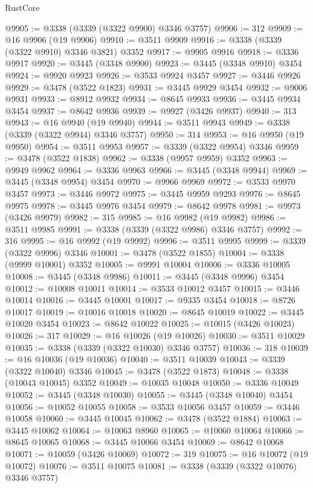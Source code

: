 \begin{lexlean}{RustCore}
\begin{coremodule}
@9905 := @3338 (@3339 (@3322 @9900) @3346 @3757)
@9906 := 312
@9909 := @16 @9906 (@19 @9906)
@9910 := @3511 @9909
@9916 := @3338 (@3339 (@3322 @9910) @3346 @3821) @3352
@9917 := @9905 @9916
@9918 := @3336 @9917
@9920 := @3445 (@3348 @9900)
@9923 := @3445 (@3348 @9910) @3454
@9924 := @9920 @9923
@9926 := @3533 @9924 @3457
@9927 := @3446 @9926
@9929 := @3478 (@3522 @1823)
@9931 := @3445 @9929 @3454
@9932 := @9006 @9931
@9933 := @8912 @9932
@9934 := @8645 @9933
@9936 := @3445 @9934 @3454
@9937 := @8642 @9936
@9939 := @9927 (@3426 @9937)
@9940 := 313
@9943 := @16 @9940 (@19 @9940)
@9944 := @3511 @9943
@9949 := @3338 (@3339 (@3322 @9944) @3346 @3757)
@9950 := 314
@9953 := @16 @9950 (@19 @9950)
@9954 := @3511 @9953
@9957 := @3339 (@3322 @9954) @3346
@9959 := @3478 (@3522 @1838)
@9962 := @3338 (@9957 @9959) @3352
@9963 := @9949 @9962
@9964 := @3336 @9963
@9966 := @3445 (@3348 @9944)
@9969 := @3445 (@3348 @9954) @3454
@9970 := @9966 @9969
@9972 := @3533 @9970 @3457
@9973 := @3446 @9972
@9975 := @3445 @9959 @9293
@9976 := @8645 @9975
@9978 := @3445 @9976 @3454
@9979 := @8642 @9978
@9981 := @9973 (@3426 @9979)
@9982 := 315
@9985 := @16 @9982 (@19 @9982)
@9986 := @3511 @9985
@9991 := @3338 (@3339 (@3322 @9986) @3346 @3757)
@9992 := 316
@9995 := @16 @9992 (@19 @9992)
@9996 := @3511 @9995
@9999 := @3339 (@3322 @9996) @3346
@10001 := @3478 (@3522 @1855)
@10004 := @3338 (@9999 @10001) @3352
@10005 := @9991 @10004
@10006 := @3336 @10005
@10008 := @3445 (@3348 @9986)
@10011 := @3445 (@3348 @9996) @3454
@10012 := @10008 @10011
@10014 := @3533 @10012 @3457
@10015 := @3446 @10014
@10016 := @3445 @10001
@10017 := @9335 @3454
@10018 := @8726 @10017
@10019 := @10016 @10018
@10020 := @8645 @10019
@10022 := @3445 @10020 @3454
@10023 := @8642 @10022
@10025 := @10015 (@3426 @10023)
@10026 := 317
@10029 := @16 @10026 (@19 @10026)
@10030 := @3511 @10029
@10035 := @3338 (@3339 (@3322 @10030) @3346 @3757)
@10036 := 318
@10039 := @16 @10036 (@19 @10036)
@10040 := @3511 @10039
@10043 := @3339 (@3322 @10040) @3346
@10045 := @3478 (@3522 @1873)
@10048 := @3338 (@10043 @10045) @3352
@10049 := @10035 @10048
@10050 := @3336 @10049
@10052 := @3445 (@3348 @10030)
@10055 := @3445 (@3348 @10040) @3454
@10056 := @10052 @10055
@10058 := @3533 @10056 @3457
@10059 := @3446 @10058
@10060 := @3445 @10045
@10062 := @3478 (@3522 @1884)
@10063 := @3445 @10062
@10064 := @10063 @8960
@10065 := @10060 @10064
@10066 := @8645 @10065
@10068 := @3445 @10066 @3454
@10069 := @8642 @10068
@10071 := @10059 (@3426 @10069)
@10072 := 319
@10075 := @16 @10072 (@19 @10072)
@10076 := @3511 @10075
@10081 := @3338 (@3339 (@3322 @10076) @3346 @3757)

\end{coremodule}
\end{lexlean}
